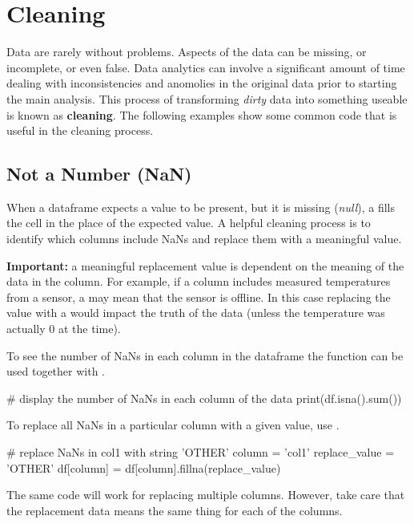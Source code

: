 \chapter{Cleaning}
\label{chapter:cleaning}

Data are rarely without problems. Aspects of the data can be missing, or incomplete, or even false. Data analytics can involve a significant amount of time dealing with inconsistencies and anomolies in the original data prior to starting the main analysis. This process of transforming \textit{dirty} data into something useable is known as \textbf{cleaning}. The following examples show some common code that is useful in the cleaning process.

\section{Not a Number (NaN)}

When a dataframe expects a value to be present, but it is missing (\textit{null}), a  fills the cell in the place of the expected value. A helpful cleaning process is to identify which columns include NaNs and replace them with a meaningful value.

\textbf{Important:} a meaningful replacement value is dependent on the meaning of the data in the column. For example, if a column includes measured temperatures from a sensor, a  may mean that the sensor is offline. In this case replacing the value with a  would impact the truth of the data (unless the temperature was actually 0 at the time).

To see the number of NaNs in each column in the dataframe the  function can be used together with .

\begin{pycode}
    # display the number of NaNs in each column of the data
    print(df.isna().sum())
\end{pycode}

To replace all NaNs in a particular column with a given value, use .

\begin{pycode}
    # replace NaNs in col1 with string 'OTHER'
    column = 'col1'
    replace_value = 'OTHER'
    df[column] = df[column].fillna(replace_value)
\end{pycode}

The same code will work for replacing multiple columns. However, take care that the replacement data means the same thing for each of the columns.

